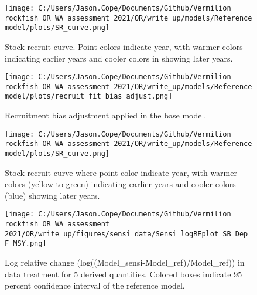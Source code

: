\documentclass[11pt,
  english,
  a4paper,
]{article}
\begin{document}
\begin{figure}
\centering
\texttt{[image: C:/Users/Jason.Cope/Documents/Github/Vermilion rockfish OR WA assessment 2021/OR/write\_up/models/Reference model/plots/SR\_curve.png]}
\caption{Stock-recruit curve. Point colors indicate year, with warmer colors indicating earlier years and cooler colors in showing later years.\label{fig:bh-curve}}
\end{figure}

\tagmcend\tagstructend


\begin{figure}
\centering
\texttt{[image: C:/Users/Jason.Cope/Documents/Github/Vermilion rockfish OR WA assessment 2021/OR/write\_up/models/Reference model/plots/recruit\_fit\_bias\_adjust.png]}
\caption{Recruitment bias adjustment applied in the base model.\label{fig:bias-adj}}
\end{figure}

\tagmcend\tagstructend


\begin{figure}
\centering
\texttt{[image: C:/Users/Jason.Cope/Documents/Github/Vermilion rockfish OR WA assessment 2021/OR/write\_up/models/Reference model/plots/SR\_curve.png]}
\caption{Stock recruit curve where point color indicate year, with warmer colors (yellow to green) indicating earlier years and cooler colors (blue) showing later years.\label{fig:sr-curve}}
\end{figure}

\tagmcend\tagstructend


\begin{figure}
\centering
\texttt{[image: C:/Users/Jason.Cope/Documents/Github/Vermilion rockfish OR WA assessment 2021/OR/write\_up/figures/sensi\_data/Sensi\_logREplot\_SB\_Dep\_F\_MSY.png]}
\caption{Log relative change (log((Model\_sensi-Model\_ref)/Model\_ref)) in data treatment for 5 derived quantities. Colored boxes indicate 95 percent confidence interval of the reference model.\label{fig:sensi-data-RE}}
\end{figure}
\end{document}
